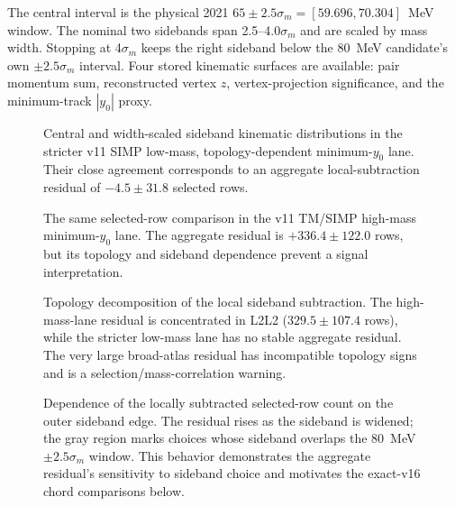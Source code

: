 The central interval is the physical 2021
$65\pm2.5\sigma_m=[59.696,70.304]$~MeV window.  The nominal two sidebands span
2.5--4.0$\sigma_m$ and are scaled by mass width.  Stopping at
4$\sigma_m$ keeps the right sideband below the 80~MeV candidate's own
$\pm2.5\sigma_m$ interval.  Four stored kinematic surfaces are available:
pair momentum sum, reconstructed vertex $z$, vertex-projection significance,
and the minimum-track $|y_0|$ proxy.

\begin{figure}[H]
\centering
{}
\caption{Central and width-scaled sideband kinematic distributions in the
stricter v11 SIMP low-mass, topology-dependent minimum-$y_0$ lane.  Their
close agreement corresponds to an aggregate local-subtraction residual of
$-4.5\pm31.8$ selected rows.}
\label{fig:v4p2-m065-kinematics-lowmass}
\end{figure}

\begin{figure}[H]
\centering
{}
\caption{The same selected-row comparison in the v11 TM/SIMP high-mass
minimum-$y_0$ lane.  The aggregate residual is $+336.4\pm122.0$ rows, but its
topology and sideband dependence prevent a signal interpretation.}
\label{fig:v4p2-m065-kinematics-highmass}
\end{figure}

\begin{figure}[H]
\centering
{}
\caption{Topology decomposition of the local sideband subtraction.  The
high-mass-lane residual is concentrated in L2L2
($329.5\pm107.4$ rows), while the stricter low-mass lane has no stable
aggregate residual.  The very large broad-atlas residual has incompatible
topology signs and is a selection/mass-correlation warning.}
\label{fig:v4p2-m065-kinematics-topology}
\end{figure}

\begin{figure}[H]
\centering
{}
\caption{Dependence of the locally subtracted selected-row count on the outer
sideband edge.  The residual rises as the sideband is widened; the gray region
marks choices whose sideband overlaps the 80~MeV $\pm2.5\sigma_m$ window.
This behavior demonstrates the aggregate residual's sensitivity to sideband
choice and motivates the exact-v16 chord comparisons below.}
\label{fig:v4p2-m065-kinematics-sidebands}
\end{figure}

